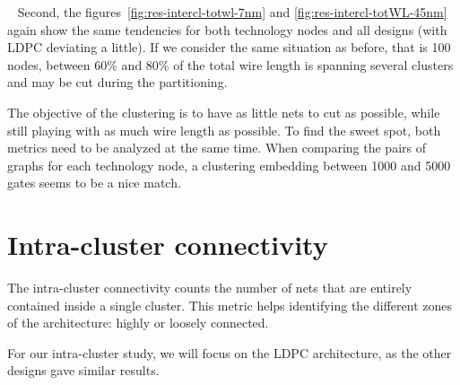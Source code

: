 \documentclass[11pt,a4paper]{report} %
\theoremstyle{customdef}
\begin{document}
~\newline{}
Second, the figures~\ref{fig:res-intercl-totwl-7nm} and \ref{fig:res-intercl-totWL-45nm} again show the same tendencies for both technology nodes and all designs (with LDPC deviating a little).
If we consider the same situation as before, that is 100 nodes, between 60\% and 80\% of the total wire length is spanning several clusters and may be cut during the partitioning.

The objective of the clustering is to have as little nets to cut as possible, while still playing with as much wire length as possible.
To find the sweet spot, both metrics need to be analyzed at the same time.
When comparing the pairs of graphs for each technology node, a clustering embedding between 1000 and 5000 gates seems to be a nice match.








\clearpage
\section{Intra-cluster connectivity}\label{sec:res-intracl}
The intra-cluster connectivity counts the number of nets that are entirely contained inside a single cluster.
This metric helps identifying the different zones of the architecture: highly or loosely connected.

For our intra-cluster study, we will focus on the LDPC architecture, as the other designs gave similar results.
\end{document}
